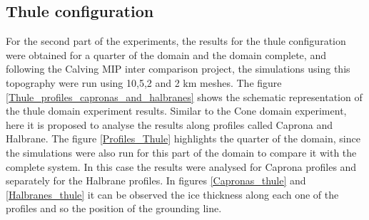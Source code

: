 \documentclass{article}
\begin{document}
\subsection{Thule configuration}
For the second part of the experiments, the results for the thule configuration were obtained for a quarter of the domain and the domain complete, and following the Calving MIP inter comparison project, the simulations using this topography were run using 10,5,2 and 2 km meshes. The figure \ref{Thule_profiles_capronas_and_halbranes} shows the schematic representation of the thule domain experiment results. Similar to the Cone domain experiment, here it is proposed to analyse the results along profiles called Caprona and Halbrane. The figure \ref{Profiles_Thule} highlights the quarter of the domain, since the simulations were also run for this part of the domain to compare it with the complete system. In this case the results were analysed for Caprona profiles and separately for the Halbrane profiles. In figures \ref{Capronas_thule} and \ref{Halbranes_thule} it can be observed the ice thickness along each one of the profiles and so the position of the grounding line.
\end{document}
